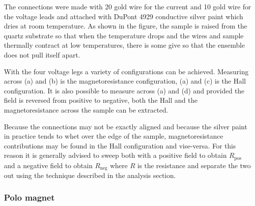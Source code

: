 The connections were made with \unit{20}{\micro\metre} gold wire for the current and \unit{10}{\micro\metre} gold wire for the voltage leads and attached with DuPont 4929 conductive silver paint which dries at room temperature. As shown in the figure, the sample is raised from the quartz substrate so that when the temperature drops and the wires and sample thermally contract at low temperatures, there is some give so that the ensemble does not pull itself apart.

With the four voltage legs a variety of configurations can be achieved. Measuring across (a) and (b) is the magnetoresistance configuration, (a) and (c) is the Hall configuration. It is also possible to measure across (a) and (d) and provided the field is reversed from positive to negative, both the Hall and the magnetoresistance across the sample can be extracted.

Because the connections may not be exactly aligned and because the silver paint in practice tends to whet over the edge of the sample, magnetoresistance contributions may be found in the Hall configuration and vise-versa. For this reason it is generally advised to sweep both with a positive field to obtain $R_{\textrm{pos}}$ and a negative field to obtain $R_{\textrm{neg}}$ where $R$ is the resistance and separate the two out using the technique described in the analysis section.


\subsubsection{Polo magnet}

